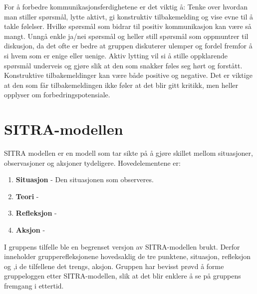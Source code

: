 For å forbedre kommunikasjonsferdighetene er det viktig å: Tenke over hvordan man stiller spørsmål, lytte aktivt, gi konstruktiv tilbakemelding og vise evne til å takle følelser. 
Hvilke spørsmål som bidrar til positiv kommunikasjon kan være så mangt. 
Unngå enkle ja/nei spørsmål og heller still spørsmål som oppmuntrer til diskusjon, da det ofte er bedre at gruppen diskuterer ulemper og fordel fremfor å si hvem som er enige eller uenige. 
Aktiv lytting vil si å stille oppklarende spørsmål underveis og gjøre slik at den som snakker føles seg hørt og forstått. 
Konstruktive tilbakemeldinger kan være både positive og negative. 
Det er viktige at den som får tilbakemeldingen ikke føler at det blir gitt kritikk, men heller opplyser om forbedringspotensiale. 

\section{SITRA-modellen}
SITRA modellen er en modell som tar sikte på å gjøre skillet mellom situasjoner, observasjoner og aksjoner tydeligere.
Hovedelementene er:

\begin{enumerate}
  \item \textbf{Situasjon} - Den situasjonen som observeres.
  \item \textbf{Teori} - 
  \item \textbf{Refleksjon} -
  \item \textbf{Aksjon} - 
\end{enumerate}

I gruppens tilfelle ble en begrenset versjon av SITRA-modellen brukt. 
Derfor inneholder grupperefleksjonene hovedsaklig de tre punktene, situasjon, refleksjon og ,i de tilfellene det trengs, aksjon.
Gruppen har bevisst prøvd å forme gruppeloggen etter SITRA-modellen, slik at det blir enklere å se på gruppens fremgang i ettertid. 

